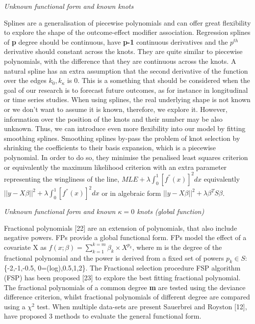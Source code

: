 \documentclass[14pt,]{article}
\begin{document}
\emph{Unknown functional form and known knots }

Splines are a generalisation of piecewise polynomials and can offer
great flexibility to explore the shape of the outcome-effect modifier
association. Regression splines of \textbf{p} degree should be
continuous, have \textbf{p-1} continuous derivatives and the \(p^{th}\)
derivative should constant across the knots. They are quite similar to
piecewise polynomials, with the difference that they are continuous
across the knots. A natural spline has an extra assumption that the
second derivative of the function over the edges \(k_0, k_{\kappa}\) is
0. This is a something that should be considered when the goal of our
research is to forecast future outcomes, as for instance in longitudinal
or time series studies. When using splines, the real underlying shape is
not known or we don't want to assume it is known, therefore, we explore
it. However, information over the position of the knots and their number
may be also unknown. Thus, we can introduce even more flexibility into
our model by fitting smoothing splines. Smoothing splines by-pass the
problem of knot selection by shrinking the coefficients to their basis
expansion, which is a piecewise polynomial. In order to do so, they
minimise the penalised least squares criterion or equivalently the
maximum likelihood criterion with an extra parameter representing the
wingliness of the line, \(MLE + \lambda\int_0^1[f^{''}(x)]^2 dx\)
equivalently \(|| y - X\beta ||^2 + \lambda\int_0^1[f^{''}(x)]^2 dx\) or
in algebraic form \(|| y - X\beta ||^2 + \lambda\beta^TS\beta\).

\emph{Unknown functional form and known \(\kappa = 0\) knots (global
function)}

Fractional polynomials {[}22{]} are an extension of polynomials, that
also include negative powers. FPs provide a global functional form. FPs
model the effect of a covariate X as
\(f(x;\beta) = \sum_{k=1}^{k=m} \beta_{k} \times X^{p_{k}}\), where m is
the degree of the fractional polynomial and the power is derived from a
fixed set of powers \(p_k \in S :\) \{-2,-1,-0.5, 0=(log),0.5,1,2\}. The
Fractional selection procedure FSP algorithm (FSP) has been proposed
{[}23{]} to explore the best fitting fractional polynomial. The
fractional polynomials of a common degree \textbf{m} are tested using
the deviance difference criterion, whilst fractional polynomials of
different degree are compared using a \(\chi^2\) test. When multiple
data-sets are present Sauerbrei and Royston {[}12{]}, have proposed 3
methods to evaluate the general functional form.
\end{document}
